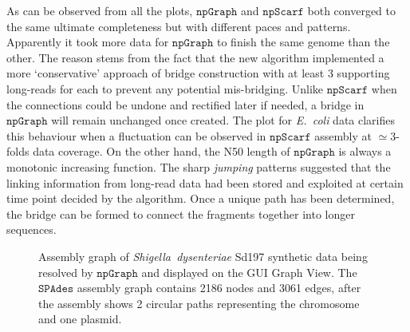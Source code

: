 \documentclass[10pt,twocolumn,twoside]{genpaper}
\newcommand{\npscarf}{$\mathtt{npScarf}$}
\newcommand{\npgraph}{$\mathtt{npGraph}$}
\newcommand{\spades}{$\mathtt{SPAdes}$}
\newcommand{\ec}{\emph{E.~coli}}
\begin{document}
As can be observed from all the plots, \npgraph{} and \npscarf{} both converged to the same ultimate completeness but with different paces and patterns.
Apparently it took more data for \npgraph{} to finish the same genome than the other.
The reason stems from the fact that the new algorithm implemented a more `conservative' approach of bridge construction with at least 3 supporting long-reads for each to prevent any potential mis-bridging. 
Unlike \npscarf{} when the connections could be undone and rectified later if needed, a bridge in \npgraph{} will remain unchanged once created.
The plot for \ec{} data clarifies this behaviour when a fluctuation can be observed in \npscarf{} assembly at $\simeq 3$-folds data coverage.
On the other hand, the N50 length of \npgraph{} is always a monotonic increasing function. 
The sharp \emph{jumping} patterns suggested that the linking information from long-read data had been stored and exploited at certain time point decided by the algorithm.
Once a unique path has been determined, the bridge can be formed to connect the fragments together into longer sequences.


\begin{figure}[!hpt]
\centering
{}
\hfill
{}
\caption[Assembly graph resolving on \npgraph{} Graph View]{Assembly graph of \emph{Shigella~dysenteriae} Sd197 synthetic data being resolved by \npgraph{} and displayed on the GUI Graph View. The \spades{} assembly graph contains 2186 nodes and 3061 edges, after the assembly shows 2 circular paths representing the chromosome and one plasmid.}
\label{F:npgraph_graphview}
\end{figure}
\end{document}
